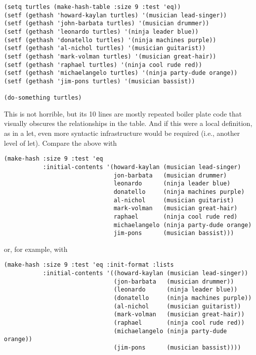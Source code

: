 \documentclass[11pt]{article}
\begin{document}
\begin{verbatim}
(setq turtles (make-hash-table :size 9 :test 'eq))
(setf (gethash 'howard-kaylan turtles) '(musician lead-singer))
(setf (gethash 'john-barbata turtles) '(musician drummer))
(setf (gethash 'leonardo turtles) '(ninja leader blue))
(setf (gethash 'donatello turtles) '(ninja machines purple))
(setf (gethash 'al-nichol turtles) '(musician guitarist))
(setf (gethash 'mark-volman turtles) '(musician great-hair))
(setf (gethash 'raphael turtles) '(ninja cool rude red))
(setf (gethash 'michaelangelo turtles) '(ninja party-dude orange))
(setf (gethash 'jim-pons turtles) '(musician bassist))

(do-something turtles)
\end{verbatim}


 

  This is not horrible, but its 10 lines are mostly repeated boiler plate code that
  visually obscures the relationships in the table. And if this
  were a local definition, as in a let, even more syntactic infrastructure would
  be required (i.e., another level of let). Compare the above with


\begin{verbatim}
(make-hash :size 9 :test 'eq
           :initial-contents '(howard-kaylan (musician lead-singer)
                               jon-barbata   (musician drummer)
                               leonardo      (ninja leader blue)
                               donatello     (ninja machines purple)
                               al-nichol     (musician guitarist)
                               mark-volman   (musician great-hair)
                               raphael       (ninja cool rude red)
                               michaelangelo (ninja party-dude orange)
                               jim-pons      (musician bassist)))
\end{verbatim}




  or, for example, with
  

\begin{verbatim}
(make-hash :size 9 :test 'eq :init-format :lists
           :initial-contents '((howard-kaylan (musician lead-singer))
                               (jon-barbata   (musician drummer))
                               (leonardo      (ninja leader blue))
                               (donatello     (ninja machines purple))
                               (al-nichol     (musician guitarist))
                               (mark-volman   (musician great-hair))
                               (raphael       (ninja cool rude red))
                               (michaelangelo (ninja party-dude orange))
                               (jim-pons      (musician bassist))))
\end{verbatim}
\end{document}

